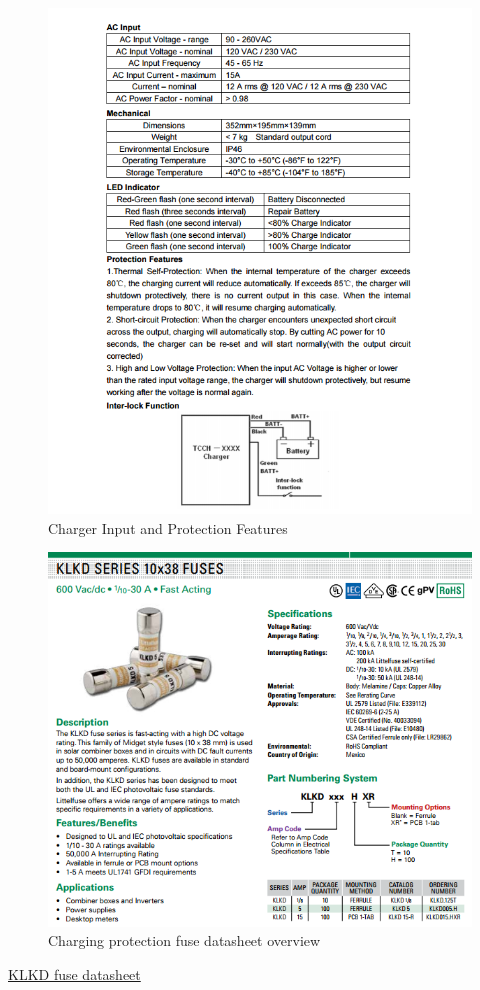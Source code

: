 \documentclass{article}
\begin{document}
\begin{figure}[H]
	\includegraphics[width=\linewidth]{charger_input}
	\caption{Charger Input and Protection Features} 
\end{figure}

\begin{figure}[H]
    \includegraphics[width=0.9\linewidth]{Littelfuse_KLKD.png}
    \caption{Charging protection fuse datasheet overview} 
\end{figure}
\href{http://www.littelfuse.com/~/media/electrical/datasheets/fuses/industrial-and-ul-fuses/littelfuse_fuse_klkd_datasheet.pdf}{KLKD fuse datasheet}
\end{document}
